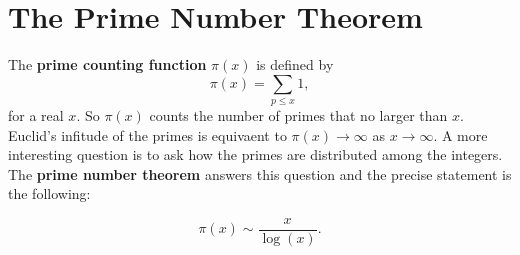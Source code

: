     \section{The Prime Number Theorem}
      The \textbf{prime counting function} $\pi(x)$ is defined by
      \[
        \pi(x) = \sum_{p \le x}1,
      \]
      for a real $x$. So $\pi(x)$ counts the number of primes that no larger than $x$. Euclid's infitude of the primes is equivaent to $\pi(x) \to \infty$ as $x \to \infty$. A more interesting question is to ask how the primes are distributed among the integers. The \textbf{prime number theorem} answers this question and the precise statement is the following:

      \begin{theorem}
        \phantom{ }
        \[
          \pi(x) \sim \frac{x}{\log(x)}.
        \]
      \end{theorem}

